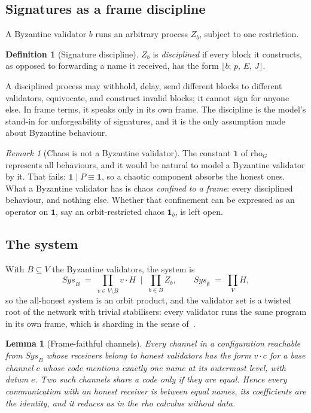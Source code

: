 \documentclass[11pt]{article}
\newtheorem{lemma}[theorem]{Lemma}
\theoremstyle{definition}
\newtheorem{definition}[theorem]{Definition}
\theoremstyle{remark}
\newtheorem{remark}[theorem]{Remark}
\newcommand{\calc}{\mathrm{rho}_G}
\newcommand{\chaos}{\mathbf{1}}
\newcommand{\act}[2]{#1\cdot #2}
\newcommand{\scong}{\equiv}
\newcommand{\blk}[4]{\lfloor #1;\, #2,\, #3,\, #4\rfloor}
\begin{document}
\subsection{Signatures as a frame discipline}

A Byzantine validator $b$ runs an arbitrary process $Z_b$, subject to one
restriction.

\begin{definition}[Signature discipline]
$Z_b$ is \emph{disciplined} if every block it constructs, as opposed to
forwarding a name it received, has the form $\blk{b}{p}{E}{J}$.
\end{definition}

A disciplined process may withhold, delay, send different blocks to different
validators, equivocate, and construct invalid blocks; it cannot sign for
anyone else. In frame terms, it speaks only in its own frame. The discipline
is the model's stand-in for unforgeability of signatures, and it is the only
assumption made about Byzantine behaviour.

\begin{remark}[Chaos is not a Byzantine validator]
The constant $\chaos$ of $\calc$ represents all behaviours, and it would be
natural to model a Byzantine validator by it. That fails: $\chaos\mid P\scong
\chaos$, so a chaotic component absorbs the honest ones. What a Byzantine
validator has is chaos \emph{confined to a frame}: every disciplined behaviour,
and nothing else. Whether that confinement can be expressed as an
operator on $\chaos$, say an orbit-restricted chaos $\chaos_b$, is left open.
\end{remark}

\subsection{The system}

With $B\subseteq V$ the Byzantine validators, the system is
\[
\mathit{Sys}_B \;=\; \textstyle\prod_{v\in V\setminus B}\act{v}{H}
\;\mid\;\prod_{b\in B}Z_b ,
\qquad
\mathit{Sys}_\emptyset \;=\; \textstyle\prod_{V}H ,
\]
so the all-honest system is an orbit product, and the validator set is a
twisted root of the network with trivial stabilisers: every validator runs the
same program in its own frame, which is sharding in the sense
of~\cite[\S6]{oriented}.

\begin{lemma}[Frame-faithful channels]\label{lem:faithful}
Every channel in a configuration reachable from $\mathit{Sys}_B$ whose
receivers belong to honest validators has the form $\act{v}{c}$ for a base
channel $c$ whose code mentions exactly one name at its outermost level, with
datum $e$. Two such channels share a code only if they are equal. Hence every
communication with an honest receiver is between equal names, its coefficients
are the identity, and it reduces as in the rho calculus without data.
\end{lemma}
\end{document}
